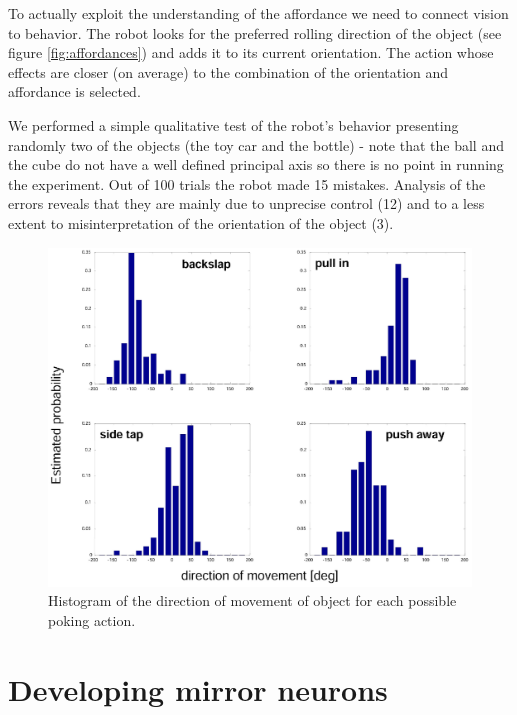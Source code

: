 To actually exploit the understanding of the affordance we need to connect vision to 
behavior. The robot looks for the preferred rolling direction of the object
(see figure \ref{fig:affordances}) and adds it to its current orientation. 
The action whose effects are closer (on average) to the combination of the orientation
and affordance is selected.

We performed a simple qualitative test of the robot's behavior presenting randomly
two of the objects (the toy car and the bottle) - note that the ball and the cube 
do not have a well defined principal axis so there is no point in running the 
experiment. Out of 100 trials the robot made 15 mistakes. Analysis 
of the errors reveals that they are mainly due to unprecise control (12) and to a
less extent to misinterpretation of the orientation of the object (3).

\begin{figure}[tb]
\begin{center}
\includegraphics[width=12cm]{actions.eps}
\caption{ 
\label{fig:actions}
%
Histogram of the direction of movement of object for each possible poking action.
%
}
\end{center}
\end{figure}


\section{Developing mirror neurons}

